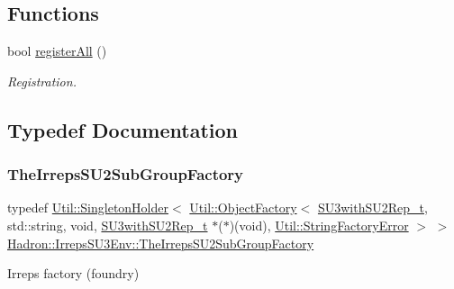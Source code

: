 \subsection*{Functions}
\begin{DoxyCompactItemize}
\item 
bool \mbox{\hyperlink{namespaceHadron_1_1IrrepsSU3Env_a7f85fa639d12623fddad0c09ba7ddef8}{register\+All}} ()
\begin{DoxyCompactList}\small\item\em Registration. \end{DoxyCompactList}\end{DoxyCompactItemize}


\subsection{Typedef Documentation}
\mbox{\label{namespaceHadron_1_1IrrepsSU3Env_a9181cfdbbaf06ae969f8608df49cdd7b}} 
\subsubsection{\texorpdfstring{TheIrrepsSU2SubGroupFactory}{TheIrrepsSU2SubGroupFactory}}
{\footnotesize\ttfamily typedef \mbox{\hyperlink{classUtil_1_1SingletonHolder}{Util\+::\+Singleton\+Holder}}$<$ \mbox{\hyperlink{classUtil_1_1ObjectFactory}{Util\+::\+Object\+Factory}}$<$ \mbox{\hyperlink{structHadron_1_1SU3withSU2Rep__t}{S\+U3with\+S\+U2\+Rep\+\_\+t}}, std\+::string, void, \mbox{\hyperlink{structHadron_1_1SU3withSU2Rep__t}{S\+U3with\+S\+U2\+Rep\+\_\+t}} $\ast$($\ast$)(void), \mbox{\hyperlink{structUtil_1_1StringFactoryError}{Util\+::\+String\+Factory\+Error}} $>$ $>$ \mbox{\hyperlink{namespaceHadron_1_1IrrepsSU3Env_a9181cfdbbaf06ae969f8608df49cdd7b}{Hadron\+::\+Irreps\+S\+U3\+Env\+::\+The\+Irreps\+S\+U2\+Sub\+Group\+Factory}}}



Irreps factory (foundry) 

\mbox{\label{namespaceHadron_1_1IrrepsSU3Env_afae3999d49fb44dd4174d52c7857e0a0}} 
